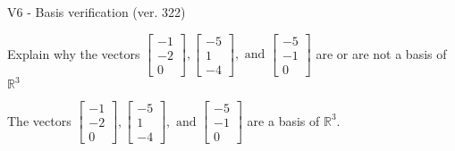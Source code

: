 \begin{exercise}
  \begin{exerciseTitle}V6 - Basis verification (ver. 322)\end{exerciseTitle}
  \begin{exerciseStatement}
    Explain why the vectors \(\left[\begin{array}{r}
-1 \\
-2 \\
0
\end{array}\right] , \left[\begin{array}{r}
-5 \\
1 \\
-4
\end{array}\right] , \text{ and } \left[\begin{array}{r}
-5 \\
-1 \\
0
\end{array}\right]\) are or are not a basis of \(\mathbb{R}^3\)	


  \end{exerciseStatement}
  \begin{exerciseAnswer}
   The vectors \(\left[\begin{array}{r}
-1 \\
-2 \\
0
\end{array}\right] , \left[\begin{array}{r}
-5 \\
1 \\
-4
\end{array}\right] , \text{ and } \left[\begin{array}{r}
-5 \\
-1 \\
0
\end{array}\right]\) 
  	 are  a basis of \(\mathbb{R}^3\).
  


  \end{exerciseAnswer}
\end{exercise}